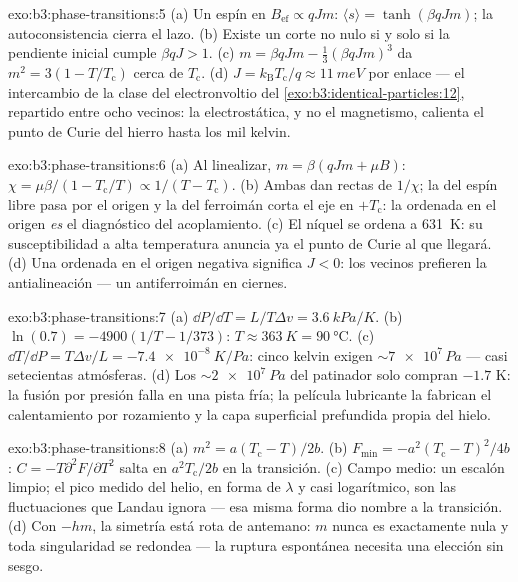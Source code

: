 \begin{solution}{exo:b3:phase-transitions:5}
(a) Un espín en $B_{\text{ef}} \propto qJm$: $\langle s\rangle =
\tanh(\beta qJm)$; la autoconsistencia cierra el lazo. (b) Existe un
corte no nulo si y solo si la pendiente inicial cumple $\beta qJ > 1$. (c) $m =
\beta qJm - \tfrac13(\beta qJm)^3$ da $m^2 = 3(1 -
T/T_{\text{c}})$ cerca de $T_{\text{c}}$. (d) $J =
k_{\text{B}}T_{\text{c}}/q \approx \qty{11}{meV}$ por enlace ---
el intercambio de la clase del electronvoltio del
\cref{exo:b3:identical-particles:12}, repartido entre ocho
vecinos: la electrostática, y no el magnetismo, calienta el punto de Curie
del hierro hasta los mil kelvin.
\end{solution}

\begin{solution}{exo:b3:phase-transitions:6}
(a) Al linealizar, $m = \beta(qJm + \mu B)$: $\chi =
\mu\beta/(1 - T_{\text{c}}/T) \propto 1/(T - T_{\text{c}})$. (b)
Ambas dan rectas de $1/\chi$; la del espín libre pasa
por el origen y la del ferroimán corta el eje en
$+T_{\text{c}}$: la ordenada en el origen \emph{es} el diagnóstico del
acoplamiento. (c) El níquel se ordena a \qty{631}{K}: su susceptibilidad a
alta temperatura anuncia ya el punto de Curie al que llegará.
(d) Una ordenada en el origen negativa significa $J < 0$: los vecinos prefieren
la antialineación --- un antiferroimán en ciernes.
\end{solution}

\begin{solution}{exo:b3:phase-transitions:7}
(a) $\dd P/\dd T = L/T\Delta v = \qty{3.6}{kPa/K}$. (b)
$\ln(0.7) = -4900(1/T - 1/373)$: $T \approx \qty{363}{K} =
\qty{90}{\celsius}$. (c) $\dd T/\dd P = T\Delta v/L =
\qty{-7.4e-8}{K/Pa}$: cinco kelvin exigen $\sim\num{7e7}\,\unit{Pa}$
--- casi setecientas atmósferas. (d) Los
$\sim\qty{2e7}{Pa}$ del patinador solo compran $-1.7$ K: la fusión por presión falla en
una pista fría; la película lubricante la fabrican el calentamiento por rozamiento
y la capa superficial prefundida propia del hielo.
\end{solution}

\begin{solution}{exo:b3:phase-transitions:8}
(a) $m^2 = a(T_{\text{c}} - T)/2b$. (b) $F_{\min} =
-a^2(T_{\text{c}} - T)^2/4b$: $C = -T\partial^2F/\partial T^2$
salta en $a^2T_{\text{c}}/2b$ en la transición. (c) Campo medio:
un escalón limpio; el pico medido del helio, en forma de $\lambda$ y casi logarítmico,
son las fluctuaciones que Landau ignora --- esa misma forma dio
nombre a la transición. (d) Con $-hm$, la simetría está
rota de antemano: $m$ nunca es exactamente nula y toda singularidad se
redondea --- la ruptura espontánea necesita una elección sin sesgo.
\end{solution}

